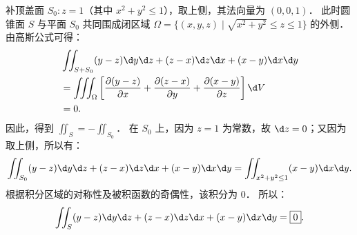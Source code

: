 \begin{solution}
    补顶盖面 $S_0: z = 1$（其中 $x^2 + y^2 \le 1$），取上侧，其法向量为 $(0, 0, 1)$．
    此时圆锥面 $S$ 与平面 $S_0$ 共同围成闭区域 $\Omega = \{ (x, y, z) \mid \sqrt{x^2 + y^2} \le z \le 1 \}$ 的外侧．由高斯公式可得：
    \begin{equation}
        \label{eq:cone-1}
        \begin{aligned}
             & \iint_{S + S_0} (y - z) \d y \d z + (z - x) \d z \d x + (x - y) \d x \d y                                                                    \\
             & = \iiint_{\Omega} \left[ \frac{\partial(y-z)}{\partial x} + \frac{\partial(z-x)}{\partial y} + \frac{\partial(x-y)}{\partial z} \right] \d V \\
             & = 0.
        \end{aligned}
    \end{equation}
    因此，得到 $\iint_{S} = - \iint_{S_0}$．
    在 $S_0$ 上，因为 $z = 1$ 为常数，故 $\d z = 0$；又因为取上侧，所以有：
    \begin{equation}
        \label{eq:cone-2}
        \iint_{S_0} (y - z) \d y \d z + (z - x) \d z \d x + (x - y) \d x \d y = \iint_{x^2+y^2 \le 1} (x - y) \d x \d y.
    \end{equation}
    根据积分区域的对称性及被积函数的奇偶性，该积分为 $0$．
    所以：
    \begin{equation}
        \label{eq:cone-3}
        \iint_{S} (y - z) \d y \d z + (z - x) \d z \d x + (x - y) \d x \d y = \boxed{0}.
    \end{equation}



\end{solution}
